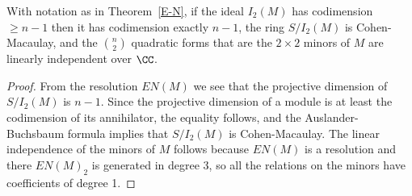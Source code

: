 \begin{corollary}\label{E-N cor}
With notation as in Theorem~\ref{E-N}, if the ideal $I_2(M)$ has codimension $\geq n-1$ then it has
codimension exactly $n-1$, the ring $S/I_2(M)$ is Cohen-Macaulay, and the $\binom{n}{2}$ quadratic forms
that are the $2\times 2$ minors of $M$ are linearly independent over $\CC$.
\end{corollary}

\begin{proof}
From the resolution $EN(M)$ we see that the projective dimension of $S/I_2(M)$ is $n-1$. Since the projective dimension of a module
is at least the codimension of its annihilator, the equality follows, and the Auslander-Buchsbaum formula implies that $S/I_2(M)$ is 
Cohen-Macaulay. The linear independence of the minors of $M$ follows because $EN(M)$ is a resolution and there
$EN(M)_2$ is generated in degree 3, so all the relations on the minors have coefficients of degree 1.
\end{proof}

